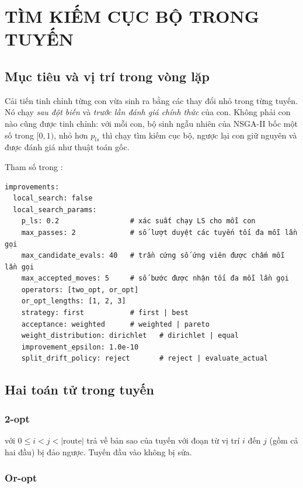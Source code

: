 \chapter{TÌM KIẾM CỤC BỘ TRONG TUYẾN}
\label{chap:ls}

\section{Mục tiêu và vị trí trong vòng lặp}

Cải tiến  tinh chỉnh từng con vừa sinh ra bằng các thay đổi nhỏ trong từng tuyến.
Nó chạy \emph{sau đột biến} và \emph{trước lần đánh giá chính thức} của con. Không phải con nào cũng
được tinh chỉnh: với mỗi con, bộ sinh ngẫu nhiên của NSGA-II bốc một số trong $[0,1)$, nhỏ hơn $p_{ls}$
thì chạy tìm kiếm cục bộ, ngược lại con giữ nguyên và được đánh giá như thuật toán gốc.

Tham số trong :
\begin{Verbatim}
improvements:
  local_search: false
  local_search_params:
    p_ls: 0.2                 # xác suất chạy LS cho mỗi con
    max_passes: 2             # số lượt duyệt các tuyến tối đa mỗi lần gọi
    max_candidate_evals: 40   # trần cứng số ứng viên được chấm mỗi lần gọi
    max_accepted_moves: 5     # số bước được nhận tối đa mỗi lần gọi
    operators: [two_opt, or_opt]
    or_opt_lengths: [1, 2, 3]
    strategy: first           # first | best
    acceptance: weighted      # weighted | pareto
    weight_distribution: dirichlet   # dirichlet | equal
    improvement_epsilon: 1.0e-10
    split_drift_policy: reject       # reject | evaluate_actual
\end{Verbatim}

\section{Hai toán tử trong tuyến}

\subsection{2-opt}

 với $0 \le i < j < |\text{route}|$ trả về bản sao của tuyến với đoạn từ vị
trí $i$ đến $j$ (gồm cả hai đầu) bị đảo ngược. Tuyến đầu vào không bị sửa.

\subsection{Or-opt}

